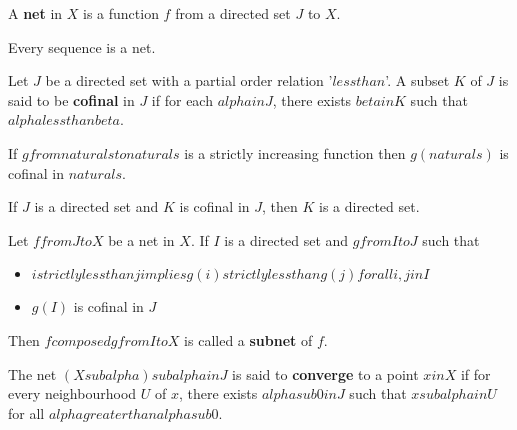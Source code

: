 \begin{defn}
    A \textbf{net} in $X$ is a function $f$ from a directed set $J$ to $X$.
\end{defn}

\begin{note}
Every sequence is a net.
\end{note}

\begin{defn}
    Let $J$ be a directed set with a partial order relation '$less than$'. A subset $K$ of $J$ is said to be \textbf{cofinal} in $J$ if for each $alpha in J$, there exists $beta in K$ such that $alpha less than beta$.
\end{defn}

\begin{prop}
    If $g from naturals to naturals$ is a strictly increasing function then $g(naturals)$ is cofinal in $naturals$.
\end{prop}

\begin{thm}
    If $J$ is a directed set and $K$ is cofinal in $J$, then $K$ is a directed set.
\end{thm}

\begin{defn}
    Let $f from J to X$ be a net in $X$. If $I$ is a directed set and $g from I to J$ such that
    \begin{itemize}
        \item $i strictly less than j implies g(i) strictly less than g(j) for all i, j in I$
        \item $g(I)$ is cofinal in $J$
    \end{itemize}
    Then $f composed g from I to X$ is called a \textbf{subnet} of $f$.
\end{defn}

\begin{defn}
    The net $(X sub alpha) sub {alpha in J}$ is said to \textbf{converge} to a point $x in X$ if for every neighbourhood $U$ of $x$, there exists $alpha sub 0 in J$ such that $x sub alpha in U$ for all $alpha greater than alpha sub 0$.
\end{defn}

\hhrule 
